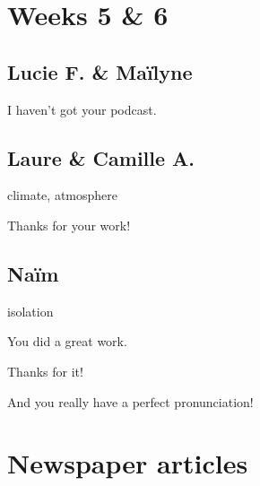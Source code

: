 \documentclass[12pt,oneside]{report}
\begin{document}
\begin{spacing}{1.2}
\section{Weeks 5 \& 6}

\subsection*{Lucie F. \& Maïlyne}

\color{blue}
I haven't got your podcast.
\color{black}

\subsection*{Laure \& Camille A.}

climate, atmosphere

\color{blue}
Thanks for your work!
\color{black}

\subsection*{Naïm}

isolation

\color{blue}
You did a great work.

Thanks for it! 

And you really have a perfect pronunciation!
\color{black}




\section{Newspaper articles}




\end{spacing}
\end{document}
